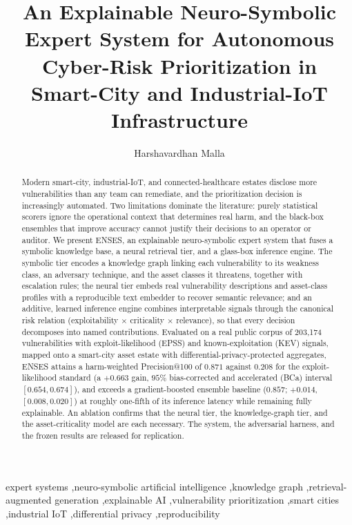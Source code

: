 \documentclass[review,3p,times]{elsarticle}
\begin{document}
\begin{frontmatter}

\title{An Explainable Neuro-Symbolic Expert System for Autonomous Cyber-Risk
Prioritization in Smart-City and Industrial-IoT Infrastructure}

\author{Harshavardhan Malla}

\begin{abstract}
Modern smart-city, industrial-IoT, and connected-healthcare estates disclose
more vulnerabilities than any team can remediate, and the prioritization
decision is increasingly automated. Two limitations dominate the literature:
purely statistical scorers ignore the operational context that determines real
harm, and the black-box ensembles that improve accuracy cannot justify their
decisions to an operator or auditor. We present ENSES, an explainable
neuro-symbolic expert system that fuses a symbolic knowledge base, a neural
retrieval tier, and a glass-box inference engine. The symbolic tier encodes a
knowledge graph linking each vulnerability to its weakness class, an adversary
technique, and the asset classes it threatens, together with escalation rules;
the neural tier embeds real vulnerability descriptions and asset-class profiles
with a reproducible text embedder to recover semantic relevance; and an
additive, learned inference engine combines interpretable signals through the
canonical risk relation (exploitability $\times$ criticality $\times$ relevance),
so that every decision decomposes into named contributions. Evaluated on a real
public corpus of 203{,}174 vulnerabilities with exploit-likelihood (EPSS) and
known-exploitation (KEV) signals, mapped onto a smart-city asset estate with
differential-privacy-protected aggregates, ENSES attains a harm-weighted
Precision@100 of $0.871$ against $0.208$ for the exploit-likelihood standard
(a $+0.663$ gain, $95\%$ bias-corrected and accelerated (BCa) interval
$[0.654,0.674]$), and exceeds a gradient-boosted ensemble baseline ($0.857$;
$+0.014$, $[0.008,0.020]$) at roughly one-fifth of its inference latency while
remaining fully explainable. An ablation confirms that the neural tier, the
knowledge-graph tier, and the asset-criticality model are each necessary. The
system, the adversarial harness, and the frozen results are released for
replication.
\end{abstract}

\begin{keyword}
expert systems \sep neuro-symbolic artificial intelligence \sep knowledge graph
\sep retrieval-augmented generation \sep explainable AI \sep vulnerability
prioritization \sep smart cities \sep industrial IoT \sep differential privacy
\sep reproducibility
\end{keyword}

\end{frontmatter}
\end{document}
